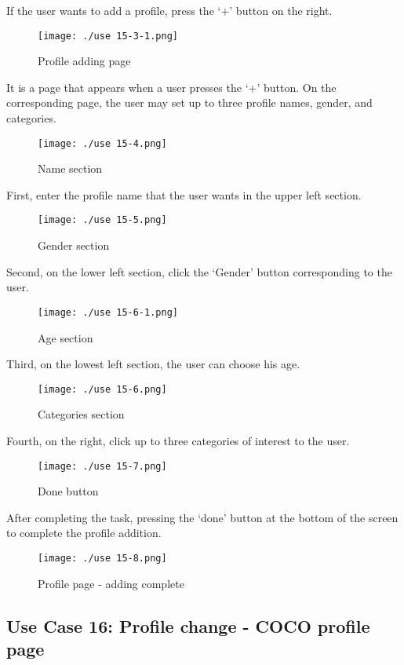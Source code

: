 \documentclass[conference]{IEEEtran}
\begin{document}
If the user wants to add a profile, press the ‘+' button on the right.

\begin{figure}[H]
\texttt{[image: ./use 15-3-1.png]}
\centering
\caption{Profile adding page}
\end{figure}

It is a page that appears when a user presses the ‘+' button. On the corresponding page, the user may set up to three profile names, gender, and categories.

\begin{figure}[H]
\texttt{[image: ./use 15-4.png]}
\centering
\caption{Name section}
\end{figure}

First, enter the profile name that the user wants in the upper left section.

\begin{figure}[H]
\texttt{[image: ./use 15-5.png]}
\centering
\caption{Gender section}
\end{figure}

Second, on the lower left section, click the ‘Gender' button corresponding to the user.

\begin{figure}[H]
\texttt{[image: ./use 15-6-1.png]}
\centering
\caption{Age section}
\end{figure}

Third, on the lowest left section, the user can choose his age.

\begin{figure}[H]
\texttt{[image: ./use 15-6.png]}
\centering
\caption{Categories section}
\end{figure}

Fourth, on the right, click up to three categories of interest to the user.

\begin{figure}[H]
\texttt{[image: ./use 15-7.png]}
\centering
\caption{Done button}
\end{figure}

After completing the task, pressing the ‘done' button at the bottom of the screen to complete the profile addition.

\begin{figure}[H]
\texttt{[image: ./use 15-8.png]}
\centering
\caption{Profile page - adding complete}
\end{figure}

\subsection{Use Case 16: Profile change - COCO profile page}
\end{document}
